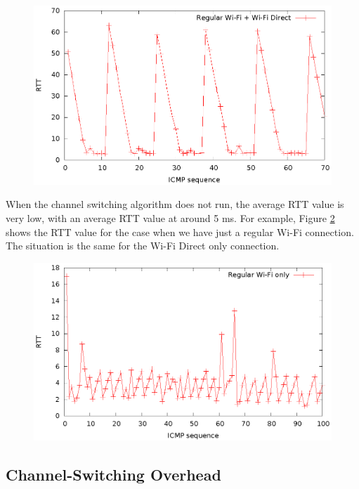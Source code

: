 \begin{figure}[h!]
\includegraphics{src/img/wifidirectping.eps}
\label{img:wifi-direct}
\end{figure}

When the channel switching algorithm does not run, the average RTT value is very low, with an average RTT value at around 5 ms. For example, Figure \ref{img:regularwifionly} shows the RTT value for the case when we have just a regular Wi-Fi connection. The situation is the same for the Wi-Fi Direct only connection.

\begin{figure}[h!]
\includegraphics{src/img/regularwifionly.eps}
\label{img:regularwifionly}
\end{figure}

\newpage
\subsection{Channel-Switching Overhead}
\label{sub-sec:chsw-overhead}

